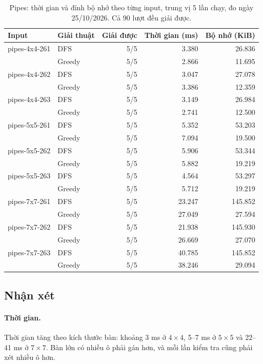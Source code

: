 \begin{table}[H]
\centering\small
\begin{tabular}{@{}llrrr@{}}
\toprule
Input & Giải thuật & Giải được & Thời gian (ms) & Bộ nhớ (KiB)\\
\midrule
pipes-4x4-261 & DFS    & 5/5 & 3.380  & 26.836\\
              & Greedy & 5/5 & 2.866  & 11.695\\
\midrule
pipes-4x4-262 & DFS    & 5/5 & 3.047  & 27.078\\
              & Greedy & 5/5 & 3.386  & 12.359\\
\midrule
pipes-4x4-263 & DFS    & 5/5 & 3.149  & 26.984\\
              & Greedy & 5/5 & 2.741  & 12.500\\
\midrule
pipes-5x5-261 & DFS    & 5/5 & 5.352  & 53.203\\
              & Greedy & 5/5 & 7.094  & 19.500\\
\midrule
pipes-5x5-262 & DFS    & 5/5 & 5.906  & 53.344\\
              & Greedy & 5/5 & 5.882  & 19.219\\
\midrule
pipes-5x5-263 & DFS    & 5/5 & 4.564  & 53.297\\
              & Greedy & 5/5 & 5.712  & 19.219\\
\midrule
pipes-7x7-261 & DFS    & 5/5 & 23.247 & 145.852\\
              & Greedy & 5/5 & 27.049 & 27.594\\
\midrule
pipes-7x7-262 & DFS    & 5/5 & 21.938 & 145.930\\
              & Greedy & 5/5 & 26.669 & 27.070\\
\midrule
pipes-7x7-263 & DFS    & 5/5 & 40.785 & 145.852\\
              & Greedy & 5/5 & 38.246 & 29.094\\
\bottomrule
\end{tabular}
\caption{Pipes: thời gian và đỉnh bộ nhớ theo từng input, trung vị 5 lần chạy,
đo ngày 25/10/2026. Cả 90 lượt đều giải được.}
\label{tab:pipes-per-input}
\end{table}

\subsection{Nhận xét}
\paragraph{Thời gian.} Thời gian tăng theo kích thước bàn: khoảng 3 ms ở
$4\times4$, 5--7 ms ở $5\times5$ và 22--41 ms ở $7\times7$. Bàn lớn có nhiều ô
phải gán hơn, và mỗi lần kiểm tra cũng phải xét nhiều ô hơn.

